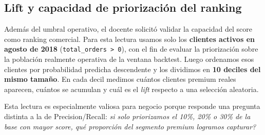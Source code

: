 \documentclass[journal,letterpaper]{IEEEtran}
\begin{document}
\begin{table}[h]
\centering
\caption{Comparativa de Estrategias Comerciales}
\label{tab:roi}
\end{table}

\subsection{Lift y capacidad de priorización del ranking}
Además del umbral operativo, el docente solicitó validar la capacidad del score como ranking comercial. Para esta lectura usamos solo los \textbf{clientes activos en agosto de 2018} (\texttt{total\_orders > 0}), con el fin de evaluar la priorización sobre la población realmente operativa de la ventana backtest. Luego ordenamos esos clientes por probabilidad predicha descendente y los dividimos en \textbf{10 deciles del mismo tamaño}. En cada decil medimos cuántos clientes premium reales aparecen, cuántos se acumulan y cuál es el \textit{lift} respecto a una selección aleatoria.

Esta lectura es especialmente valiosa para negocio porque responde una pregunta distinta a la de Precision/Recall: \textit{si solo priorizamos el 10\%, 20\% o 30\% de la base con mayor score, qué proporción del segmento premium logramos capturar?}
\end{document}
